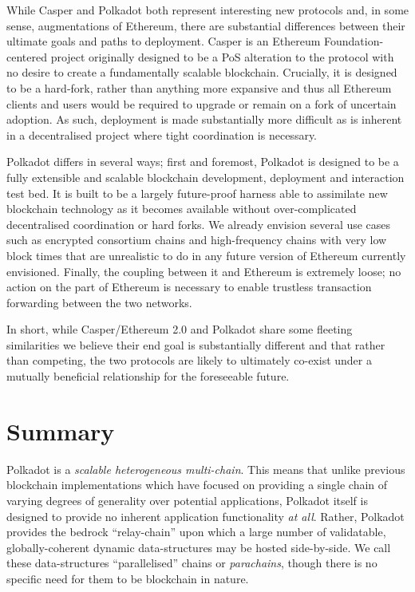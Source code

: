 \documentclass{beamer}
\begin{document}
\begin{frame}
 While Casper and Polkadot both represent interesting new protocols and, in some sense, augmentations of Ethereum, there are substantial differences between their ultimate goals and paths to deployment. Casper is an Ethereum Foundation-centered project originally designed to be a PoS alteration to the protocol with no desire to create a fundamentally scalable blockchain. Crucially, it is designed to be a hard-fork, rather than anything more expansive and thus all Ethereum clients and users would be required to upgrade or remain on a fork of uncertain adoption. As such, deployment is made substantially more difficult as is inherent in a decentralised project where tight coordination is necessary.

 Polkadot differs in several ways; first and foremost, Polkadot is designed to be a fully extensible and scalable blockchain development, deployment and interaction test bed. It is built to be a largely future-proof harness able to assimilate new blockchain technology as it becomes available without over-complicated decentralised coordination or hard forks. We already envision several use cases such as encrypted consortium chains and high-frequency chains with very low block times that are unrealistic to do in any future version of Ethereum currently envisioned. Finally, the coupling between it and Ethereum is extremely loose; no action on the part of Ethereum is necessary to enable trustless transaction forwarding between the two networks.

 In short, while Casper/Ethereum 2.0 and Polkadot share some fleeting similarities we believe their end goal is substantially different and that rather than competing, the two protocols are likely to ultimately co-exist under a mutually beneficial relationship for the foreseeable future.

\section{Summary}\label{summary}

Polkadot is a \emph{scalable heterogeneous multi-chain}. This means that unlike previous blockchain implementations which have focused on providing a single chain of varying degrees of generality over potential applications, Polkadot itself is designed to provide no inherent application functionality \emph{at all}. Rather, Polkadot provides the bedrock ``relay-chain'' upon which a large number of validatable, globally-coherent dynamic data-structures may be hosted side-by-side. We call these data-structures ``parallelised'' chains or \textit{parachains}, though there is no specific need for them to be blockchain in nature.


\end{frame}
\end{document}
